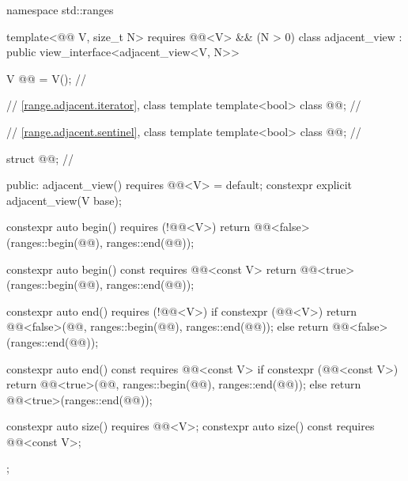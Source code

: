 %
%
%
\begin{codeblock}
namespace std::ranges {
  template<@@ V, size_t N>
    requires @@<V> && (N > 0)
  class adjacent_view : public view_interface<adjacent_view<V, N>> {
    V @@ = V();                      // \expos

    // \ref{range.adjacent.iterator}, class template 
    template<bool> class @@;      // \expos

    // \ref{range.adjacent.sentinel}, class template 
    template<bool> class @@;      // \expos

    struct @@{};               // \expos

  public:
    adjacent_view() requires @@<V> = default;
    constexpr explicit adjacent_view(V base);

    constexpr auto begin() requires (!@@<V>) {
      return @@<false>(ranges::begin(@@), ranges::end(@@));
    }

    constexpr auto begin() const requires @@<const V> {
      return @@<true>(ranges::begin(@@), ranges::end(@@));
    }

    constexpr auto end() requires (!@@<V>) {
      if constexpr (@@<V>) {
        return @@<false>(@@{}, ranges::begin(@@), ranges::end(@@));
      } else {
        return @@<false>(ranges::end(@@));
      }
    }

    constexpr auto end() const requires @@<const V> {
      if constexpr (@@<const V>) {
        return @@<true>(@@{}, ranges::begin(@@), ranges::end(@@));
      } else {
        return @@<true>(ranges::end(@@));
      }
    }

    constexpr auto size() requires @@<V>;
    constexpr auto size() const requires @@<const V>;
  };
}
\end{codeblock}

